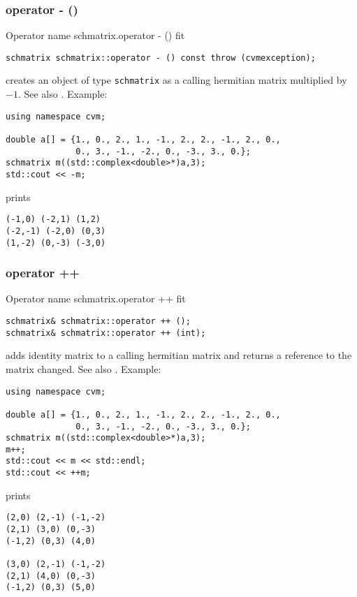\subsubsection{operator - ()}
Operator%
\pdfdest name {schmatrix.operator - ()} fit
\begin{verbatim}
schmatrix schmatrix::operator - () const throw (cvmexception);
\end{verbatim}
creates an object of type \verb"schmatrix" as
a calling hermitian matrix multiplied by $-1$.
See also .
Example:
\begin{Verbatim}
using namespace cvm;

double a[] = {1., 0., 2., 1., -1., 2., 2., -1., 2., 0.,
              0., 3., -1., -2., 0., -3., 3., 0.};
schmatrix m((std::complex<double>*)a,3);
std::cout << -m;
\end{Verbatim}
prints
\begin{Verbatim}
(-1,0) (-2,1) (1,2)
(-2,-1) (-2,0) (0,3)
(1,-2) (0,-3) (-3,0)
\end{Verbatim}
\newpage



\subsubsection{operator ++}
Operator%
\pdfdest name {schmatrix.operator ++} fit
\begin{verbatim}
schmatrix& schmatrix::operator ++ ();
schmatrix& schmatrix::operator ++ (int);
\end{verbatim}
adds identity matrix to a calling hermitian matrix
and returns a reference to
the matrix changed.
See also .
Example:
\begin{Verbatim}
using namespace cvm;

double a[] = {1., 0., 2., 1., -1., 2., 2., -1., 2., 0.,
              0., 3., -1., -2., 0., -3., 3., 0.};
schmatrix m((std::complex<double>*)a,3);
m++;
std::cout << m << std::endl;
std::cout << ++m;
\end{Verbatim}
prints
\begin{Verbatim}
(2,0) (2,-1) (-1,-2)
(2,1) (3,0) (0,-3)
(-1,2) (0,3) (4,0)

(3,0) (2,-1) (-1,-2)
(2,1) (4,0) (0,-3)
(-1,2) (0,3) (5,0)
\end{Verbatim}
\newpage



